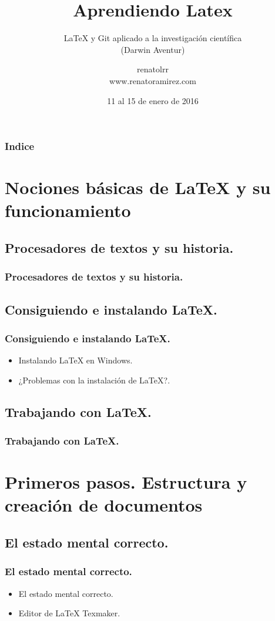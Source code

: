 \documentclass{beamer}
\title[Latex]{Aprendiendo Latex}
\subtitle{LaTeX y Git aplicado a la investigación científica\\ (Darwin Aventur)}
\author[Renato L. Ramírez Rivero]
{renatolrr\\
www.renatoramirez.com}
\date{11 al 15 de enero de 2016}
\begin{document}
\frame{\titlepage}

\begin{frame}
\frametitle{Indice}
{\tiny
\tableofcontents
}
\end{frame}

\section{Nociones básicas de LaTeX y su funcionamiento}
\subsection{Procesadores de textos y su historia.}

\begin{frame}
  \frametitle{Procesadores de textos y su historia.}
\end{frame}

\subsection{Consiguiendo e instalando LaTeX.}
\begin{frame}
  \frametitle{Consiguiendo e instalando LaTeX.}
  \begin{itemize}
  \item<1->{Instalando LaTeX en Windows.}
  \item<2->{¿Problemas con la instalación de LaTeX?.}
   \end{itemize}
\end{frame}


\subsection{Trabajando con LaTeX.}
\begin{frame}
  \frametitle{Trabajando con LaTeX.}
\end{frame}

\section{Primeros pasos. Estructura y creación de documentos}
\subsection{El estado mental correcto.}
\begin{frame}
  \frametitle{El estado mental correcto.}
 \begin{itemize}
  \item<1->{El estado mental correcto.}
  \item<2->{Editor de LaTeX Texmaker.}
  \end{itemize}
\end{frame}
\end{document}
